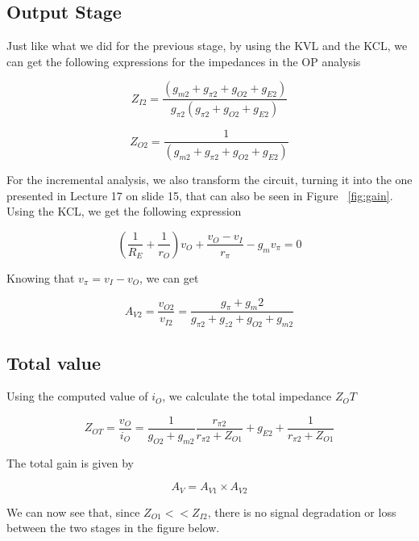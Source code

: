 \subsection{Output Stage}
Just like what we did for the previous stage, by using the KVL and the KCL, we can get the following expressions for the impedances in the OP analysis

\begin{equation}
Z_{I2} = \frac{(g_{m2}+g_{\pi 2}+g_{O2}+g_{E2})}{g_{\pi 2}(g_{\pi 2}+g_{O2}+g_{E2})}
\label{eq:1.6}
\end{equation}

\begin{equation}
Z_{O2} = \frac{1}{(g_{m2}+g_{\pi 2}+g_{O2}+g_{E2})}
\label{eq:1.7}
\end{equation}

For the incremental analysis, we also transform the circuit, turning it into the one presented in Lecture 17 on slide 15, that can also be seen in Figure ~\ref{fig:gain}. Using the KCL, we get the following expression

\begin{equation}
(\frac{1}{R_E}+\frac{1}{r_O})v_O+\frac{v_O-v_I}{r_\pi}-g_mv_\pi = 0
\label{eq:1.8}
\end{equation}

Knowing that $v_\pi = v_I - v_O$, we can get

\begin{equation}
A_{V2} = \frac{v_{O2}}{v_{I2}} = \frac{g_\pi+g_m2}{g_{\pi 2}+g_{z2}+g_{O2}+g_{m2}}
\label{eq:1.9}
\end{equation}

\subsection{Total value}
Using the computed value of $i_O$, we calculate the total impedance $Z_OT$

\begin{equation}
Z_{OT} = \frac{v_O}{i_O} = \frac{1}{g_{O2}+g_{m2}}\frac{r_{\pi 2}}{r_{\pi 2} + Z_{O1}}+g_{E2}+\frac{1}{r_{\pi 2} + Z_{O1}}
\label{eq:1.10}
\end{equation}

The total gain is given by

\begin{equation}
A_V = A_{V1} \times A_{V2}
\label{eq:1.11}
\end{equation}

We can now see that, since $Z_{O1}<<Z_{I2}$, there is no signal degradation or loss between the two stages in the figure below.

